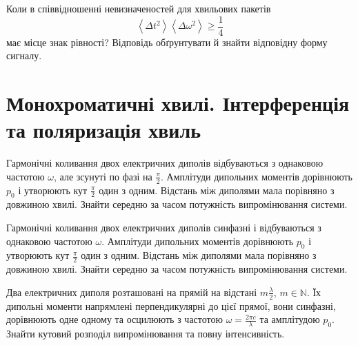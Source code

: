 \begin{problem}
Коли в співвідношенні невизначеностей для хвильових пакетів
\[
	\left\langle \Delta t^2 \right\rangle\left\langle \Delta \omega^2 \right\rangle \ge \frac14
\]
має місце знак рівності? Відповідь обґрунтувати й знайти відповідну форму сигналу.
\end{problem}


\section{Монохроматичні хвилі. Інтерференція та поляризація хвиль}


\begin{problem}
Гармонічні коливання двох електричних диполів відбуваються з однаковою частотою $\omega$, але зсунуті по фазі на $\frac{\pi}{2}$. Амплітуди дипольних моментів дорівнюють $p_0$ і утворюють кут $\frac{\pi}{2}$ один з одним. Відстань між диполями мала порівняно з довжиною хвилі. Знайти середню за часом потужність випромінювання системи.
\end{problem}

\begin{problem}
Гармонічні коливання двох електричних диполів синфазні і відбуваються з однаковою частотою $\omega$. Амплітуди дипольних моментів дорівнюють $p_0$ і утворюють кут $\frac{\pi}{2}$ один з одним. Відстань між диполями мала порівняно з довжиною хвилі. Знайти середню за часом потужність випромінювання системи.
\end{problem}

\begin{problem}
Два електричних диполя розташовані на прямій на відстані $m\frac{\lambda}{2}$, $m \in \mathbb{N}$. Їх дипольні моменти напрямлені перпендикулярні до цієї прямої, вони синфазні, дорівнюють одне одному та осцилюють з частотою $\omega  = \frac{2\pi c}{\lambda}$ та амплітудою $p_0$. Знайти кутовий розподіл випромінювання та повну інтенсивність.
\end{problem}

